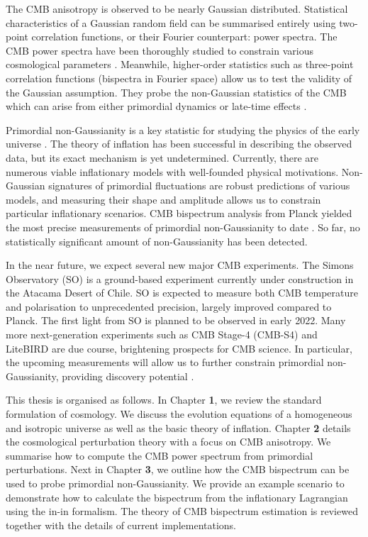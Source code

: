 The CMB anisotropy is observed to be nearly Gaussian distributed. Statistical characteristics of a Gaussian random field can be summarised entirely using two-point correlation functions, or their Fourier counterpart: power spectra. The CMB power spectra have been thoroughly studied to constrain various cosmological parameters \cite{Hinshaw2003wmapPower,Dunkley2011act,PlanckCollaboration2018power,BicepKeck2021}. Meanwhile, higher-order statistics such as three-point correlation functions (bispectra in Fourier space) allow us to test the validity of the Gaussian assumption. They probe the non-Gaussian statistics of the CMB which can arise from either primordial dynamics or late-time effects \cite{Lewis2011lensing}.

Primordial non-Gaussianity is a key statistic for studying the physics of the early universe \cite{Chen2010review,Komatsu2010}. The theory of inflation has been successful in describing the observed data, but its exact mechanism is yet undetermined. Currently, there are numerous viable inflationary models with well-founded physical motivations. Non-Gaussian signatures of primordial fluctuations are robust predictions of various models, and measuring their shape and amplitude allows us to constrain particular inflationary scenarios. CMB bispectrum analysis from Planck yielded the most precise measurements of primordial non-Gaussianity to date \cite{PlanckCollaboration2018}. So far, no statistically significant amount of non-Gaussianity has been detected.

In the near future, we expect several new major CMB experiments. The Simons Observatory (SO) \cite{TheSimonsObservatoryCollaboration2018} is a ground-based experiment currently under construction in the Atacama Desert of Chile. SO is expected to measure both CMB temperature and polarisation to unprecedented precision, largely improved compared to Planck. The first light from SO is planned to be observed in early 2022. Many more next-generation experiments such as CMB Stage-4 (CMB-S4) \cite{Abazajian2016,Abazajian2019} and LiteBIRD \cite{Hazumi2019litebird} are due course, brightening prospects for CMB science. In particular, the upcoming measurements will allow us to further constrain primordial non-Gaussianity, providing discovery potential \cite{Meerburg2019}.

\hspace{10pt}

This thesis is organised as follows. In Chapter \textbf{1}, we review the standard formulation of cosmology. We discuss the evolution equations of a homogeneous and isotropic universe as well as the basic theory of inflation. Chapter \textbf{2} details the cosmological perturbation theory with a focus on CMB anisotropy. We summarise how to compute the CMB power spectrum from primordial perturbations. Next in Chapter \textbf{3}, we outline how the CMB bispectrum can be used to probe primordial non-Gaussianity. We provide an example scenario to demonstrate how to calculate the bispectrum from the inflationary Lagrangian using the in-in formalism. The theory of CMB bispectrum estimation is reviewed together with the details of current implementations.

